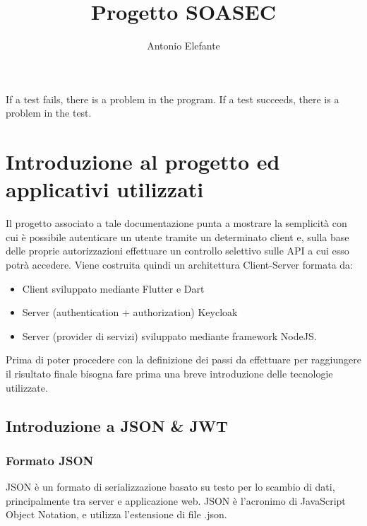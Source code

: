 \documentclass[twoside]{report}
\title{Progetto SOASEC}
\author{Antonio Elefante}
\begin{document}
\clearpage\null \thispagestyle{empty} 

\clearpage 
\thispagestyle{empty} 
\null
 \vspace{20em}
\begin{fquote}
	 If a test fails, there is a problem in the program. If a test succeeds, there is a problem in the test.
\end{fquote}

\null
 \newpage

\tableofcontents %
\newpage

\thispagestyle{empty}


\chapter{Introduzione al progetto ed applicativi utilizzati}
\thispagestyle{empty} 
Il progetto associato a tale documentazione punta a mostrare la semplicità con cui è possibile autenticare un utente tramite un determinato client e, sulla base delle proprie autorizzazioni effettuare un controllo selettivo sulle API a cui esso potrà accedere.
\bigbreak
Viene costruita quindi un architettura Client-Server formata da:

\begin{itemize}
    \item Client sviluppato mediante Flutter e Dart
    \item Server (authentication + authorization) Keycloak
    \item Server (provider di servizi) sviluppato mediante framework NodeJS.
\end{itemize}

\bigbreak
Prima di poter procedere con la definizione dei passi da effettuare per raggiungere il risultato finale bisogna fare prima una breve introduzione delle tecnologie utilizzate.
\newpage
\section{Introduzione a JSON \& JWT}
\subsection{Formato JSON}
JSON è un formato di serializzazione basato su testo per lo scambio di dati, principalmente tra server e applicazione web. JSON è l'acronimo di JavaScript Object Notation, e utilizza l'estensione di file .json.
\end{document}
